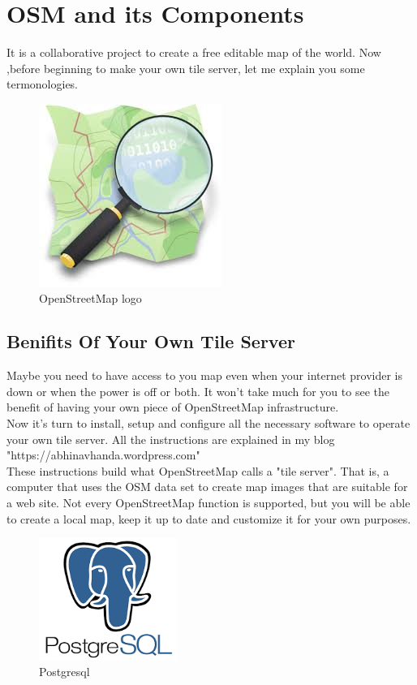 \section{OSM and its Components }
It is a collaborative project to create a free editable map of the world.
Now ,before beginning to make your own tile server, let me explain you some termonologies.
\begin{figure}[ht]
\centering \includegraphics[scale=0.6]{input/images/index.jpeg}
\caption{OpenStreetMap logo}
\end{figure}

\subsection{Benifits Of Your Own Tile Server}
Maybe you need to have access to you map even when your internet provider is down or when the power is off or both. It won't take much for you to see the benefit of having your own piece of OpenStreetMap infrastructure.\\
Now it's turn to install, setup and configure all the necessary software to operate your own tile server. All the instructions are explained in my blog "https://abhinavhanda.wordpress.com"\\
These instructions build what OpenStreetMap calls a "tile server". That is, a computer that uses the OSM data set to create map images that are suitable for a web site. Not every OpenStreetMap function is supported, but you will be able to create a local map, keep it up to date and customize it for your own purposes.
\begin{figure}[!ht]
\centering
\includegraphics[width=0.4\textwidth]{input/images/index.png}                   
\caption{Postgresql}
\hspace{-1.5em}
\end{figure}


